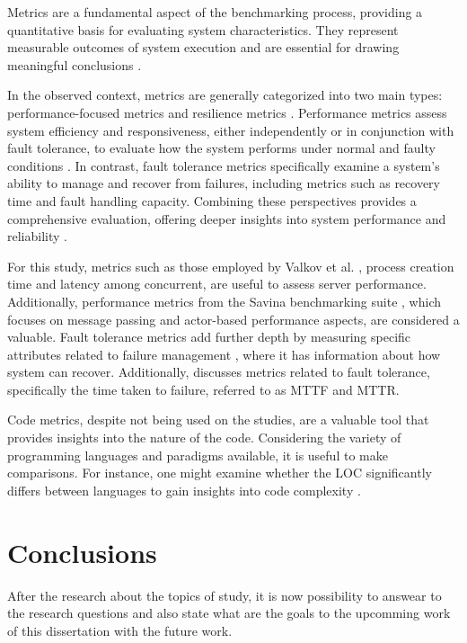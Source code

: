 Metrics are a fundamental aspect of the benchmarking process, providing a quantitative basis for evaluating system characteristics. They represent measurable outcomes of system execution and are essential for drawing meaningful conclusions \cite{Almeida2013}.

In the observed context, metrics are generally categorized into two main types: performance-focused metrics and resilience metrics \cite{Valkov2018,Randtoul2022,Almeida2013}. Performance metrics assess system efficiency and responsiveness, either independently or in conjunction with fault tolerance, to evaluate how the system performs under normal and faulty conditions \cite{Valkov2018}. In contrast, fault tolerance metrics specifically examine a system's ability to manage and recover from failures, including metrics such as recovery time and fault handling capacity. Combining these perspectives provides a comprehensive evaluation, offering deeper insights into system performance and reliability \cite{Randtoul2022}.

For this study, metrics such as those employed by Valkov et al. \cite{Valkov2018}, process creation time and latency among concurrent, are useful to assess server performance. Additionally, performance metrics from the Savina benchmarking suite \cite{Imam2014}, which focuses on message passing and actor-based performance aspects, are considered a valuable. Fault tolerance metrics add further depth by measuring specific attributes related to failure management \cite{Randtoul2022}, where it has information about how system can recover. Additionally, \textcite{Tanenbaum2023} discusses metrics related to fault tolerance, specifically the time taken to failure, referred to as \gls{MTTF} and \gls{MTTR}.

Code metrics, despite not being used on the studies, are a valuable tool that provides insights into the nature of the code. Considering the variety of programming languages and paradigms available, it is useful to make comparisons. For instance, one might examine whether the \gls{LOC} significantly differs between languages to gain insights into code complexity \cite{Tanenbaum2023}.

\section{Conclusions}

After the research about the topics of study, it is now possibility to answear to the research questions and also state what are the goals to the upcomming work of this dissertation with the future work.


